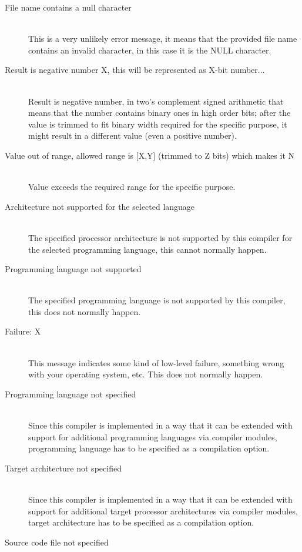 \begin{description}
        \item[File name contains a null character]~\\
            This is a very unlikely error message, it means that the provided file name contains an invalid character, in this case it is the NULL character.
        \item[Result is negative number X, this will be represented as X-bit number...]~\\
            Result is negative number, in two's complement signed arithmetic that means that the number contains binary ones in high order bits; after the value is trimmed to fit binary width required for the specific purpose, it might result in a different value (even a positive number).
        \item[Value out of range, allowed range is {[X,Y]} (trimmed to Z bits) which makes it N]~\\
            Value exceeds the required range for the specific purpose.
        \item[Architecture not supported for the selected language]~\\
            The specified processor architecture is not supported by this compiler for the selected programming language, this cannot normally happen.
        \item[Programming language not supported]~\\
            The specified programming language is not supported by this compiler, this does not normally happen.
        \item[Failure: X]~\\
            This message indicates some kind of low-level failure, something wrong with your operating system, etc. This does not normally happen.
        \item[Programming language not specified]~\\
            Since this compiler is implemented in a way that it can be extended with support for additional programming languages via compiler modules, programming language has to be specified as a compilation option.
        \item[Target architecture not specified]~\\
            Since this compiler is implemented in a way that it can be extended with support for additional target processor architectures via compiler modules, target architecture has to be specified as a compilation option.
        \item[Source code file not specified]~\\

\end{description}
